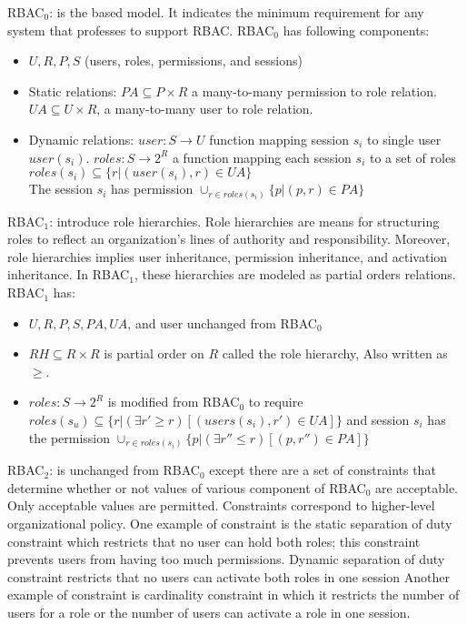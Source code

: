 \documentclass[11pt]{article}
\begin{document}
\begin{description}
{\begin{itemize}
\begin{mdframed}
	RBAC$_0$: is the based model. It indicates the minimum requirement for any system that professes to support RBAC. RBAC$_0$ has following components:
	\begin{itemize}
		\item $U, R, P, S$ (users, roles, permissions, and sessions)
		\item Static relations: $PA \subseteq P \times R$ a many-to-many permission to role relation. $UA \subseteq U\times R$, a many-to-many user to role relation. 
		\item Dynamic relations: $user: S\rightarrow U$ function mapping session $s_i$ to single user $user(s_i)$. $roles:S \rightarrow 2^R$ a function mapping each session $s_i$ to a set of roles $roles(s_i) \subseteq \{r | (user(s_i),r)\in UA\}$\\
		The session $s_i$ has permission $\cup_{r\in roles(s_i)}$$\{p | (p,r) \in PA\}$  
	\end{itemize}
	RBAC$_1$: introduce role hierarchies. Role hierarchies are means for structuring roles to reflect an organization's lines of authority and responsibility. Moreover, role hierarchies implies user inheritance, permission inheritance, and activation inheritance. In RBAC$_1$, these hierarchies are modeled as partial orders relations. RBAC$_1$ has:
	\begin{itemize}
		\item $U, R, P, S, PA, UA$, and user unchanged from RBAC$_0$
		\item $RH \subseteq R\times R$ is partial order on $R$ called the role hierarchy, Also written as $\geq$.
		\item $roles:S\rightarrow 2^R$ is modified from RBAC$_0$ to require $roles(s_u)\subseteq \{r | (\exists r' \geq r) [(users(s_i),r') \in UA]\}$ and session $s_i$ has the permission $\cup_{r\in roles(s_i)}$$\{p |(\exists r'' \leq r)[(p,r'') \in PA]\}$
	\end{itemize}
	RBAC$_2$: is unchanged from RBAC$_0$ except there are a set of constraints that determine whether or not values of various component of RBAC$_0$ are acceptable. Only acceptable values are permitted. Constraints correspond to higher-level organizational policy. One example of constraint is the static separation of duty constraint which restricts that no user can hold both roles; this constraint prevents users from having too much permissions. Dynamic separation of duty constraint restricts that no users can activate both roles in one session Another example of constraint is cardinality constraint in which it restricts the number of users for a role or the number of users can activate a role in one session.

\end{mdframed}
\end{itemize}}
\end{description}
\end{document}
